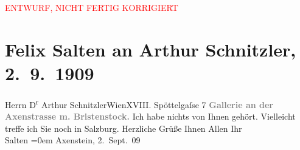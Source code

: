 
\begin{center}
            \textcolor{red}{ENTWURF, NICHT FERTIG KORRIGIERT}
                      \end{center}
            
         \renewcommand{\erwaehnteOrte}{Orte: Axenstein, Axenstraße, Bristen, Edmund-Weiß-Gasse, Morschach, Salzburg, Wien}
         \renewcommand{\erwaehnteWerke}{}
               \section[Felix Salten an Arthur Schnitzler, 2. 9. 1909]{ Felix Salten an Arthur Schnitzler, 2. 9. 1909}\nopagebreak{}\rehead{ }\begin{ledgroupsized}[t]{13cm}\normalsize\beginnumbering \toendnotes[C]{\smallbreak\pagebreak[2]} 
\pstart{}{\pb}Herrn D\textsuperscript{r} Arthur Schnitzler\pend{}\pstart{}Wien\pend{}\pstart{}XVIII. Spöttelgaſse 7\pend{}{\bigskip}\pstart
           \noindent{}\centering{}{\pb}\textcolor{gray}{\textbf{Gallerie an der Axenstrasse m. Bristenstock.}}\pend
           \pstart
           Ich habe nichts von Ihnen gehört. Vielleicht treffe ich Sie noch in Salzburg. Herzliche Grüße Ihnen Allen\pend
           \pstart
           Ihr {\\[\baselineskip]}\spacefill\mbox{Salten}\pend
           \leftskip=0em{}\pstart
           Axenstein,
                     2. Sept. 09\pend
           
         
         \endnumbering{}\end{ledgroupsized}\begin{anhang}\end{anhang}\newcommand{\dateiname}{L03508}\newcommand{\titel}{Felix Salten an Arthur Schnitzler, 2. 9. 1909}\newcommand{\editorInnen}{Martin Anton Müller und Laura Untner}
      